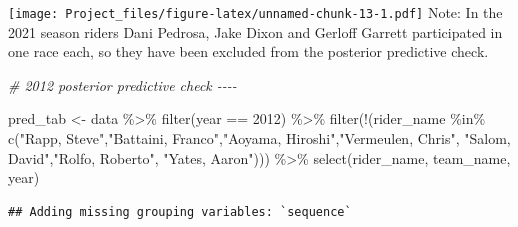 \documentclass[
]{article}
\newenvironment{Shaded}{\begin{snugshade}}{\end{snugshade}}
\newcommand{\CommentTok}[1]{\textcolor[rgb]{0.56,0.35,0.01}{\textit{#1}}}
\newcommand{\DecValTok}[1]{\textcolor[rgb]{0.00,0.00,0.81}{#1}}
\newcommand{\FunctionTok}[1]{\textcolor[rgb]{0.00,0.00,0.00}{#1}}
\newcommand{\NormalTok}[1]{#1}
\newcommand{\OtherTok}[1]{\textcolor[rgb]{0.56,0.35,0.01}{#1}}
\newcommand{\SpecialCharTok}[1]{\textcolor[rgb]{0.00,0.00,0.00}{#1}}
\newcommand{\StringTok}[1]{\textcolor[rgb]{0.31,0.60,0.02}{#1}}
\begin{document}
\texttt{[image: Project\_files/figure-latex/unnamed-chunk-13-1.pdf]}
Note: In the 2021 season riders Dani Pedrosa, Jake Dixon and Gerloff
Garrett participated in one race each, so they have been excluded from
the posterior predictive check.

\begin{Shaded}
\begin{Highlighting}[]
\CommentTok{\# 2012 posterior predictive check {-}{-}{-}{-}}

\NormalTok{pred\_tab }\OtherTok{\textless{}{-}}
\NormalTok{  data }\SpecialCharTok{\%\textgreater{}\%}
  \FunctionTok{filter}\NormalTok{(year }\SpecialCharTok{==} \DecValTok{2012}\NormalTok{) }\SpecialCharTok{\%\textgreater{}\%}
  \FunctionTok{filter}\NormalTok{(}\SpecialCharTok{!}\NormalTok{(rider\_name }\SpecialCharTok{\%in\%} \FunctionTok{c}\NormalTok{(}\StringTok{"Rapp, Steve"}\NormalTok{,}\StringTok{"Battaini, Franco"}\NormalTok{,}\StringTok{"Aoyama, Hiroshi"}\NormalTok{,}\StringTok{"Vermeulen, Chris"}\NormalTok{,}
                         \StringTok{"Salom, David"}\NormalTok{,}\StringTok{"Rolfo, Roberto"}\NormalTok{, }\StringTok{"Yates, Aaron"}\NormalTok{))) }\SpecialCharTok{\%\textgreater{}\%} 
  \FunctionTok{select}\NormalTok{(rider\_name, team\_name, year)}
\end{Highlighting}
\end{Shaded}

\begin{verbatim}
## Adding missing grouping variables: `sequence`
\end{verbatim}
\end{document}
